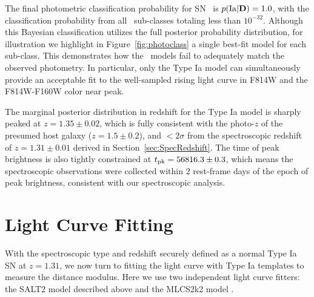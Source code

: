 The final photometric classification probability for SN \tomas\ is
$p({\rm Ia}|{\rm {\bf D}})=1.0$, with the classification probability
from all \CCSN\ sub-classes totaling less than
$10^{-32}$.  Although this Bayesian classification utilizes
the full posterior probability distribution, for illustration we
highlight in Figure~\ref{fig:photoclass} a single best-fit model for
each sub-class. This demonstrates how the \CCSN\ models fail to
adequately match the observed photometry. In particular, only the Type
Ia model can simultaneously provide an acceptable fit to the
well-sampled rising light curve in F814W and the F814W-F160W color
near peak.

The marginal posterior distribution in redshift for the Type Ia model
is sharply peaked at $z=1.35\pm0.02$, which is fully consistent with
the photo-$z$ of the presumed host galaxy ($z=1.5\pm0.2$), and
$<2\sigma$ from the spectroscopic redshift of $z=1.31\pm0.01$ derived
in Section~\ref{sec:SpecRedshift}.  The time of peak brightness is
also tightly constrained at $t_{\rm pk}=56816.3\pm0.3$, which means
the spectroscopic observations were collected within 2 rest-frame days
of the epoch of peak brightness, consistent with our spectroscopic
analysis.


\section{Light Curve Fitting}
\label{sec:LightCurveFitting}

With the spectroscopic type and redshift securely defined as a normal
Type Ia SN at $z=1.31$, we now turn to fitting the light curve with
Type Ia templates to measure the distance modulus.  Here we use two
independent light curve fitters: the SALT2 model described
above and the MLCS2k2 model \citep{Jha:2007}.   


